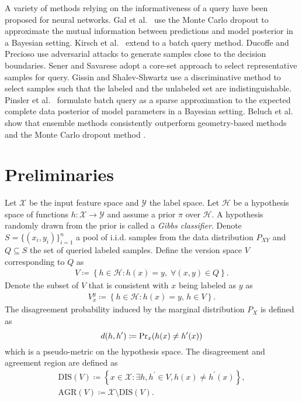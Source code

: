 \documentclass[runningheads, envcountsame, a4paper]{llncs}
\newcommand{\etal}{et al.}
\begin{document}
A variety of methods relying on the informativeness of a query have been proposed for neural networks. Gal \etal~\cite{Gal17} use the Monte Carlo dropout to approximate the mutual information between predictions and model posterior \cite{Houlsby11} in a Bayesian setting. Kirsch \etal~\cite{Kirsch19} extend \cite{Houlsby11,Gal17} to a batch query method. Ducoffe and Precioso \cite{Ducoffe18} use adversarial attacks to generate samples close to the decision boundaries. Sener and Savarese \cite{Sener18} adopt a core-set approach to select representative samples for query. Gissin and Shalev-Shwartz \cite{Gissin19} use a discriminative method to select samples such that the labeled and the unlabeled set are indistinguishable. Pinsler \etal~\cite{Pinsler19} formulate batch query as a sparse approximation to the expected complete data posterior of model parameters in a Bayesian setting. Beluch \etal~\cite{Beluch18} show that ensemble methods consistently outperform geometry-based methods \cite{Sener18} and the Monte Carlo dropout method \cite{Gal16,Gal17}. 



\section{Preliminaries}
\label{sec:preliminaries}

Let $\mathcal{X}$ be the input feature space and $\mathcal{Y}$ the label space. Let $\mathcal{H}$ be a hypothesis space of functions $h: \mathcal{X} \to \mathcal{Y}$ and assume a prior $\pi$ over $\mathcal{H}$. A hypothesis randomly drawn from the prior is called a \textit{Gibbs classifier}. Denote $S = \{(x_i, y_i)\}_{i=1}^n$ a pool of i.i.d. samples from the data distribution $P_{XY}$ and $Q \subseteq S$ the set of queried labeled samples. Define the version space $V$ corresponding to $Q$ as
\begin{align}
    V \coloneqq \left\{h\in \mathcal{H}: h(x) = y, \; \forall (x,y) \in Q \right\}.
\end{align}
Denote the subset of $V$ that is consistent with $x$ being labeled as $y$ as
\begin{align}
    V_x^y \coloneqq \left\{h\in \mathcal{H}: h(x) = y,\, h \in V \right\}.
\end{align}
The disagreement probability induced by the marginal distribution $P_X$ is defined as
\begin{equation}
d(h, h^\prime) \coloneqq \textmd{Pr}_{x} \! \left( h(x) \neq h^\prime(x) \right)
\end{equation}
which is a pseudo-metric on the hypothesis space. The disagreement and agreement region are defined as
\begin{gather}
    \text{DIS}(V) \coloneqq \left\{x \in \mathcal{X}: \exists h, h^\prime \in V, h(x) \neq h^\prime(x) \right\}, \\
    \text{AGR}(V) \coloneqq \mathcal{X} \setminus \text{DIS}(V).
\end{gather}
\end{document}
